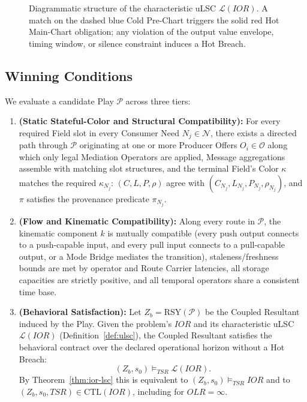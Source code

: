 \begin{figure}[t]
\caption{Diagrammatic structure of the characteristic uLSC $\mathcal{L}(IOR)$.  A match on the dashed blue Cold Pre-Chart triggers the solid red Hot Main-Chart obligation; any violation of the output value envelope, timing window, or silence constraint induces a Hot Breach.}
\label{fig:ulsc-diagram}
\end{figure}

\subsection{Winning Conditions} \label{sec:meth-winning}

We evaluate a candidate Play $\mathcal{P}$ across three tiers:
\begin{enumerate}[label=\textbf{Tier \arabic*}, leftmargin=3.4em, topsep=2pt, itemsep=1pt]
    \item \textbf{(Static Stateful-Color and Structural Compatibility):} For every required Field slot in every Consumer Need $N_j \in \mathcal{N}$, there exists a directed path through $\mathcal{P}$ originating at one or more Producer Offers $O_i \in \mathcal{O}$ along which only legal Mediation Operators are applied, Message aggregations assemble with matching slot structures, and the terminal Field's Color $\kappa$ matches the required $\kappa_{N_j}$: $(C, L, P, \rho)$ agree with $(C_{N_j}, L_{N_j}, P_{N_j}, \rho_{N_j})$, and $\pi$ satisfies the provenance predicate $\pi_{N_j}$.
    \item \textbf{(Flow and Kinematic Compatibility):} Along every route in $\mathcal{P}$, the kinematic component $k$ is mutually compatible (every push output connects to a push-capable input, and every pull input connects to a pull-capable output, or a Mode Bridge mediates the transition), staleness/freshness bounds are met by operator and Route Carrier latencies, all storage capacities are strictly positive, and all temporal operators share a consistent time base.
    \item \textbf{(Behavioral Satisfaction):} Let $Z_b = \mathrm{RSY}(\mathcal{P})$ be the Coupled Resultant induced by the Play.  Given the problem's $IOR$ and its characteristic uLSC $\mathcal{L}(IOR)$ (Definition~\ref{def:ulsc}), the Coupled Resultant satisfies the behavioral contract over the declared operational horizon without a Hot Breach:
    \[
        (Z_b, s_0) \models_{TSR} \mathcal{L}(IOR).
    \]
    By Theorem~\ref{thm:ior-lsc} this is equivalent to $(Z_b, s_0) \models_{TSR} IOR$ and to $(Z_b, s_0, TSR) \in \mathrm{CTL}(IOR)$, including for $OLR = \infty$.
\end{enumerate}

